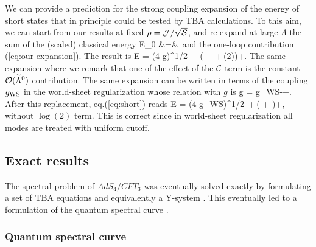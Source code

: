 We can provide a prediction for the strong coupling expansion of the energy of short states that in principle
could be tested by TBA calculations. To this aim, we 
can start from  our results at fixed $\rho = \mc J/\sqrt\mc S$, and 
re-expand at large $\Lambda$ the sum of the (scaled) classical energy 
\ba
\label{eq:classical-rho}
\mathcal E_{0} &=&\,
\ea
and the one-loop contribution (\ref{eq:our-expansion}). The result is 
\beq
\label{eq:short}
E = (4\,\pi\,g)^{1/2}\,-+\,\left(
+-+\,\log(2)\right)+\cdots.
\eeq
The same expansion 
where we remark that one of the effect of the $\mathcal C$ term 
is the constant $\mathcal O(\widetilde \Lambda^{0})$ contribution.
The same expansion can be written in terms of the coupling $g_{\rm WS}$ in the world-sheet regularization
whose relation with $g$ is \cite{McLoughlin:2008he,Abbott:2010yb}
\beq
g = g_{\rm WS}-+\cdots.
\eeq
After this replacement, eq.(\ref{eq:short}) reads  
\beq
E = (4\,\pi\,g_{\rm WS})^{1/2}\,-+\,\left(
+-\right)+\cdots,
\eeq
without $\log(2)$ term. This is correct since in world-sheet regularization all modes are treated with uniform cutoff.

\subsection{Exact results}
\label{sec:abjm_exact}

The spectral problem of $AdS_4/CFT_3$ was eventually solved exactly by formulating a set of TBA equations \cite{Gromov:2009tv} and equivalently a Y-system \cite{Bombardelli:2009xz,Gromov:2009at}.
This eventually led to a formulation of the quantum spectral curve \cite{Cavaglia:2014exa}.

\subsubsection{Quantum spectral curve}

